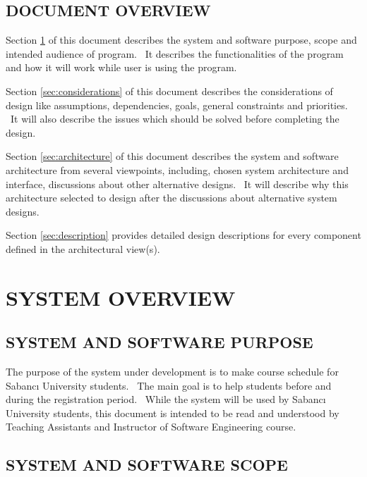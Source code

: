 \documentclass[twoside,letterpaper]{article}
\begin{document}
\smallskip

\subsection{DOCUMENT OVERVIEW}

\noindent
Section \ref{sec:overview} of this document describes the system and software purpose, scope and intended audience of program. \ 
It describes the functionalities of the program and how it will work while user is using the program. 

\bigskip

\noindent
Section \ref{sec:considerations} of this document describes the considerations of design like assumptions, dependencies, goals, general constraints and priorities. \ It will also describe the issues which should be solved before completing the design.

\bigskip

\noindent
Section \ref{sec:architecture} of this document describes the system and software architecture from several viewpoints, including, chosen system architecture and interface, discussions about other alternative designs. \ It will describe why this architecture selected to design after the discussions about alternative system designs.

\bigskip

\noindent
Section \ref{sec:description} provides detailed design descriptions for every component defined in the architectural view(s). 

\clearpage\pagestyle{Standard}
\section{SYSTEM OVERVIEW}
\label{sec:overview}

\subsection{SYSTEM AND SOFTWARE PURPOSE}

The purpose of the system under development is to make course schedule for Sabanc\i{} University students. \ The main goal is to help students before and during the registration period. \ While the system will be used by Sabanc{\i} University students,
this document is intended to be read and understood by Teaching Assistants and Instructor of Software Engineering course.

\subsection{SYSTEM AND SOFTWARE SCOPE}
\end{document}
